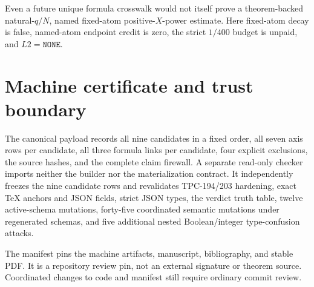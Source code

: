 \documentclass[11pt]{article}
\begin{document}
Even a future unique formula crosswalk would not itself prove a
theorem-backed natural-\(q/N\), named fixed-atom positive-\(X\)-power
estimate.  Here fixed-atom decay is false, named-atom endpoint credit is
zero, the strict \(1/400\) budget is unpaid, and \(L2=\texttt{NONE}\).

\section{Machine certificate and trust boundary}

The canonical payload records all nine candidates in a fixed order, all
seven axis rows per candidate, all three formula links per candidate, four
explicit exclusions, the source hashes, and the complete claim firewall.
A separate read-only checker imports neither the builder nor the
materialization contract.  It independently freezes the nine candidate rows
and revalidates TPC-194/203 hardening, exact TeX anchors and JSON fields,
strict JSON types, the verdict truth table, twelve active-schema mutations,
forty-five coordinated semantic mutations under regenerated schemas, and
five additional nested Boolean/integer type-confusion attacks.

The manifest pins the machine artifacts, manuscript, bibliography, and
stable PDF.  It is a repository review pin, not an external signature or
theorem source.  Coordinated changes to code and manifest still require
ordinary commit review.

\begingroup
\raggedright


\endgroup
\end{document}
